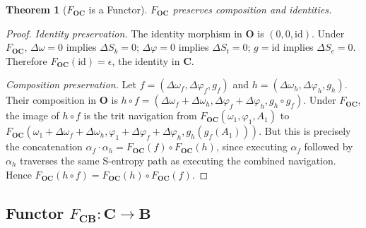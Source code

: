 \documentclass[twocolumn,10pt]{article}
\newtheorem{theorem}{Theorem}[section]
\theoremstyle{remark}
\newcommand{\Sk}{S_k}
\newcommand{\St}{S_t}
\newcommand{\Se}{S_e}
\newcommand{\CatO}{\mathbf{O}}
\newcommand{\CatC}{\mathbf{C}}
\newcommand{\CatB}{\mathbf{B}}
\newcommand{\Foc}{F_{\CatO\CatC}}
\newcommand{\Fcb}{F_{\CatC\CatB}}
\begin{document}
\begin{theorem}[$\Foc$ is a Functor]
\label{thm:Foc_functor}
$\Foc$ preserves composition and identities.
\end{theorem}

\begin{proof}
\textit{Identity preservation.}
The identity morphism in $\CatO$ is $(0,0,\mathrm{id})$.
Under $\Foc$, $\Delta\omega = 0$ implies $\Delta\Sk = 0$; $\Delta\varphi = 0$ implies $\Delta\St = 0$; $g = \mathrm{id}$ implies $\Delta\Se = 0$.
Therefore $\Foc(\mathrm{id}) = \epsilon$, the identity in $\CatC$.

\textit{Composition preservation.}
Let $f = (\Delta\omega_f, \Delta\varphi_f, g_f)$ and $h = (\Delta\omega_h, \Delta\varphi_h, g_h)$.
Their composition in $\CatO$ is $h \circ f = (\Delta\omega_f + \Delta\omega_h, \Delta\varphi_f + \Delta\varphi_h, g_h \circ g_f)$.
Under $\Foc$, the image of $h \circ f$ is the trit navigation from $\Foc(\omega_1,\varphi_1,A_1)$ to $\Foc(\omega_1 + \Delta\omega_f + \Delta\omega_h, \varphi_1 + \Delta\varphi_f + \Delta\varphi_h, g_h(g_f(A_1)))$.
But this is precisely the concatenation $\alpha_f \cdot \alpha_h = \Foc(f) \circ \Foc(h)$, since executing $\alpha_f$ followed by $\alpha_h$ traverses the same S-entropy path as executing the combined navigation.
Hence $\Foc(h \circ f) = \Foc(h) \circ \Foc(f)$.
\end{proof}

\subsection{Functor $\Fcb: \CatC \to \CatB$}
\end{document}
